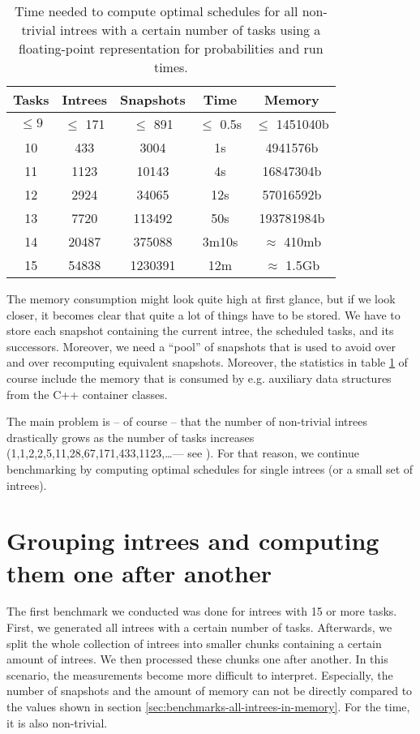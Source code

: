 \begin{table}[ht]
  \centering
  \begin{tabular}[ht]{ccccc}
    Tasks & Intrees & Snapshots & Time & Memory \\
    \hline{}
    $\leq 9$ & $\leq$ 171 & $\leq$ 891 & $\leq$ 0.5s & $\leq$ 1451040b \\
    10 & 433 & 3004 & 1s & 4941576b \\
    11 & 1123 & 10143 & 4s & 16847304b \\
    12 & 2924 & 34065 & 12s & 57016592b \\
    13 & 7720 & 113492 & 50s & 193781984b \\
    14 & 20487 & 375088 & 3m10s & $\approx$ 410mb \\
    15 & 54838 & 1230391 & 12m & $\approx$ 1.5Gb \\
    
  \end{tabular}
  \caption{Time needed to compute optimal schedules for all non-trivial intrees with a certain number of tasks using a floating-point representation for probabilities and run times.}
  \label{tab:time-benchmark}
\end{table}

The memory consumption might look quite high at first glance, but if we look closer, it becomes clear that quite a lot of things have to be stored. We have to store each snapshot containing the current intree, the scheduled tasks, and its successors. Moreover, we need a ``pool'' of snapshots that is used to avoid over and over recomputing equivalent snapshots. Moreover, the statistics in table \ref{tab:time-benchmark} of course include the memory that is consumed by e.g. auxiliary data structures from the C++ container classes.

The main problem is -- of course -- that the number of non-trivial intrees drastically grows as the number of tasks increases (1,1,2,2,5,11,28,67,171,433,1123,\dots --- see \cite{oeisnumbernontrivialintrees}). For that reason, we continue benchmarking by computing optimal schedules for single intrees (or a small set of intrees).

\section{Grouping intrees and computing them one after another}
\label{sec:benchmarks-clustered-intrees}

The first benchmark we conducted was done for intrees with 15 or more tasks. First, we generated all intrees with a certain number of tasks. Afterwards, we split the whole collection of intrees into smaller chunks containing a certain amount of intrees. We then processed these chunks one after another. In this scenario, the measurements become more difficult to interpret. Especially, the number of snapshots and the amount of memory can not be directly compared to the values shown in section \ref{sec:benchmarks-all-intrees-in-memory}. For the time, it is also non-trivial.

